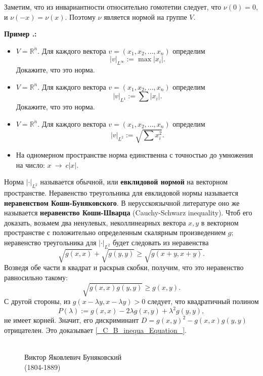 \documentclass[12pt]{book}
\newcommand{\arrow}{{\:\longrightarrow\:}}
\def\R{{\mathbb R}}
\theoremstyle{upshape}
\theoremstyle{generic}
\theoremstyle{upshapenonumber}
\newcommand{\следствие}{%
     \refstepcounter{teorema}
     {\noindent\bf Следствие \thechapter.\arabic{teorema}:\ }}
\newcommand{\пример}{%
     \refstepcounter{teorema}
     {\noindent\bf Пример \thechapter.\arabic{teorema}:\ }}
\newcommand{\лемма}{%
     \refstepcounter{teorema}
     {\noindent\bf Лемма \thechapter.\arabic{teorema}:\ }}
\newcommand{\теорема}{%
     \refstepcounter{teorema}
     {\noindent\bf Теорема \thechapter.\arabic{teorema}:\ }}
\newcommand{\утверждение}{%
     \refstepcounter{teorema}
     {\noindent\bf Утверждение \thechapter.\arabic{teorema}:\ }}
\def\хфилл{\hfill}
\def\бф{\bf}
\begin{document}
Заметим, что из инвариантности относительно гомотетии
следует, что $\nu(0)=0$, и $\nu(-x)=\nu(x)$. Поэтому
$\nu$ является нормой на группе $V$.

\хфилл


\пример
\begin{itemize}
\item $V= \R^n$. Для каждого вектора $v = (x_1, x_2, ..., x_n)$
определим \[ |v|_{L^\infty}:= \max|x_i|.\] Докажите, что это норма.
\item $V= \R^n$. Для каждого вектора $v = (x_1, x_2, ..., x_n)$
определим \[ |v|_{L^1}:= \sum |x_i|.\] Докажите, что это норма.
\item $V= \R^n$. Для каждого вектора $v = (x_1, x_2, ..., x_n)$
определим \[ |v|_{L^2}:= \sqrt{\sum x_i^2}.\] 
\item На одномерном пространстве норма единственна
с точностью до умножения на число: $x\arrow c |x|$. 
\end{itemize}

Норма $|\cdot|_{L^2}$ называется обычной, или {\бф евклидовой нормой}
на векторном пространстве. Неравенство треугольника для евклидовой
нормы называется {\бф неравенством Коши-Буняковского}. В нерусскоязычной
литературе оно же называется {\бф неравенство Коши-\-Шварца} 
(Cau\-chy-\-Schwarz inequality). Чтоб его доказать, возьмем два ненулевых, неколлинеарных 
вектора $x, y$ в векторном пространстве с положительно 
определенным скалярным произведением $g$; неравенство 
треугольника для $|\cdot|_{L^2}$ будет следовать
из неравенства 
\[ 
   \sqrt{ g(x,x)} + \sqrt{g(y,y)} \geq \sqrt{ g(x+y,x+y)}.
\]
Возведя обе части в квадрат и раскрыв скобки, получим, что
это неравенство равносильно такому:
\begin{equation}\label{_C_B_inequa_Equation_}
\sqrt{ g(x,x)g(y,y)} \geq  g(x,y).
\end{equation}
С другой стороны, из $g(x-\lambda y,x-\lambda y)> 0$ следует,
что квадратичный полином
\[
   P(\lambda):=  g(x,x)-2\lambda g(x,y) + \lambda^2 g(y,y),
\]
не имеет корней. Значит, его дискриминант
$D= g(x,y)^2-g(x,x)g(y,y)$ отрицателен.
Это доказывает \eqref{_C_B_inequa_Equation_}.



\begin{figure}[ht]
\begin{center}
\\
Виктор Яковлевич Буняковский\\
(1804-1889)
\end{center}
\end{figure}
\end{document}
